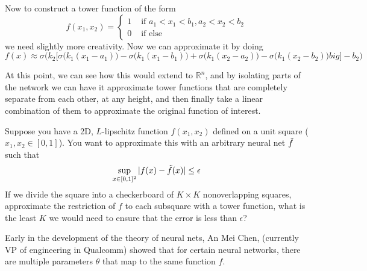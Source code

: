   \begin{example} 
    Now to construct a tower function of the form 
    \begin{equation}
      f(x_1, x_2) = \begin{cases} 1 & \text{ if } a_1 < x_1 < b_1, a_2 < x_2 < b_2 \\ 0 & \text{ if else} \end{cases}
    \end{equation}
    we need slightly more creativity. Now we can approximate it by doing 
    \begin{equation}
      f(x) \approx \sigma \bigg( k_2 \big[ \sigma\big( k_1 (x_1 - a_1)\big) - \sigma\big( k_1 (x_1 -b_1)\big) + \sigma \big( k_1 (x_2 - a_2)\big) - \sigma\big(k_1 (x_2 - b_2)\big)  big] - b_2\bigg)
    \end{equation}
  \end{example} 

  At this point, we can see how this would extend to $\mathbb{R}^n$, and by isolating parts of the network we can have it approximate tower functions that are completely separate from each other, at any height, and then finally take a linear combination of them to approximate the original function of interest.  

  \begin{theorem}[CS671 Fall 2023 PS5]
    Suppose you have a 2D, $L$-lipschitz function $f(x_1, x_2)$ defined on a unit square ($x_1, x_2 \in \left [0,1 \right ]$). You want to approximate this with an arbitrary neural net $\Tilde{f}$ such that
    \begin{equation}
      \sup_{x \in [0, 1]^2} |f(x) - \Tilde{f}(x)| \leq \epsilon
    \end{equation}
    If we divide the square into a checkerboard of $K \times K$ nonoverlapping squares, approximate the restriction of $f$ to each subsquare with a tower function, what is the least $K$ we would need to ensure that the error is less than $\epsilon$? 
  \end{theorem} 

  Early in the development of the theory of neural nets, An Mei Chen, (currently VP of engineering in Qualcomm) showed that for certain neural networks, there are multiple parameters $\theta$ that map to the same function $f$. \cite{symmetry}

